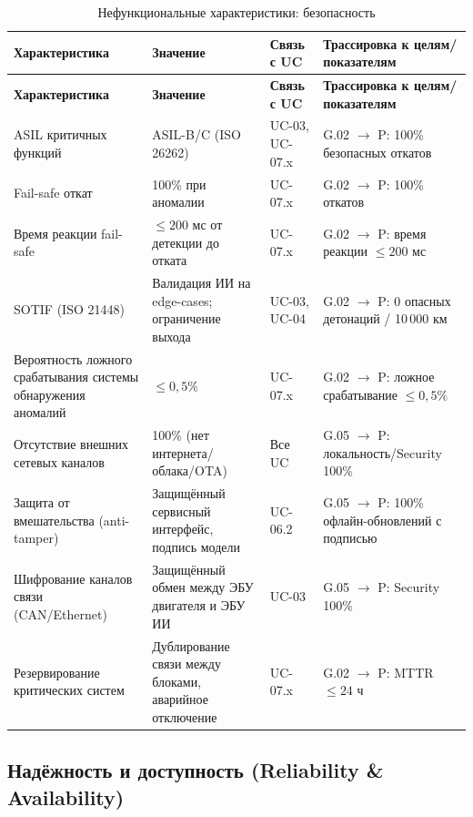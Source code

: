 \documentclass[14pt, a4paper]{extarticle}
\begin{document}
				\begin{xltabular}{\textwidth}{|L|L|L|L|}
					\caption{Нефункциональные характеристики: безопасность}\label{tab:nfr-safety}\\
					\hline
					\textbf{Характеристика} & \textbf{Значение} & \textbf{Связь с UC} & \textbf{Трассировка к целям/показателям} \\
					\hline
					\endfirsthead
					\hline
					\textbf{Характеристика} & \textbf{Значение} & \textbf{Связь с UC} & \textbf{Трассировка к целям/показателям} \\
					\hline
					\endhead
					\hline
					\endfoot
					\hline
					\endlastfoot
					ASIL критичных функций & ASIL-B/C (ISO 26262) & UC-03, UC-07.x & G.02 \(\to\) P: 100\% безопасных откатов \\
					\hline
					Fail-safe откат & 100\% при аномалии & UC-07.x & G.02 \(\to\) P: 100\% откатов \\
					\hline
					Время реакции fail-safe & \(\leq 200\) мс от детекции до отката & UC-07.x & G.02 \(\to\) P: время реакции \(\leq 200\) мс \\
					\hline
					SOTIF (ISO 21448) & Валидация ИИ на edge-cases; ограничение выхода & UC-03, UC-04 & G.02 \(\to\) P: 0 опасных детонаций / 10\,000 км \\
					\hline
					Вероятность ложного срабатывания системы обнаружения аномалий & \(\leq 0{,}5\%\) & UC-07.x & G.02 \(\to\) P: ложное срабатывание \(\leq 0{,}5\%\) \\
					\hline
					Отсутствие внешних сетевых каналов & 100\% (нет интернета/облака/OTA) & Все UC & G.05 \(\to\) P: локальность/Security 100\% \\
					\hline
					Защита от вмешательства (anti-tamper) & Защищённый сервисный интерфейс, подпись модели & UC-06.2 & G.05 \(\to\) P: 100\% офлайн-обновлений с подписью \\
					\hline
					Шифрование каналов связи (CAN/Ethernet) & Защищённый обмен между ЭБУ двигателя и ЭБУ ИИ & UC-03 & G.05 \(\to\) P: Security 100\% \\
					\hline
					Резервирование критических систем & Дублирование связи между блоками, аварийное отключение & UC-07.x & G.02 \(\to\) P: MTTR \(\leq 24\) ч \\
					\hline
				\end{xltabular}
				
				\subsection{Надёжность и доступность (Reliability \& Availability)}
				
\end{document}
